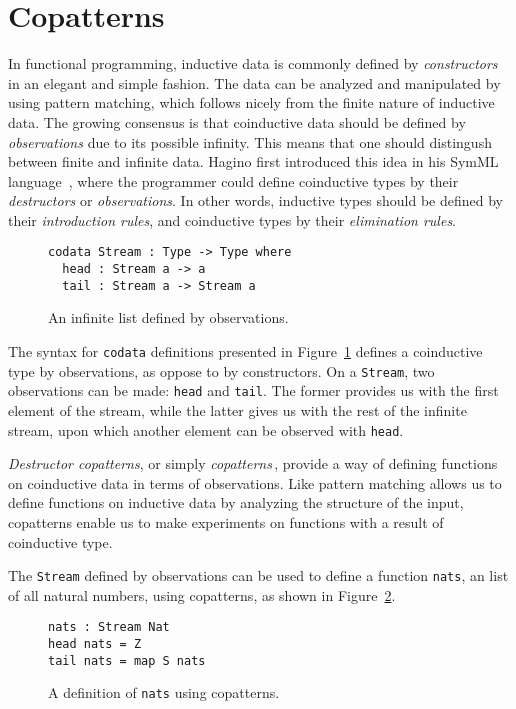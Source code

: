 \section{Copatterns}
\label{sec:copatterns}
In functional programming, inductive data is commonly defined by \emph{constructors} in an
elegant and simple fashion. The data can be analyzed and manipulated by using
pattern matching, which follows nicely from the finite nature of inductive
data. The growing consensus is that coinductive data should be defined by
\emph{observations} due to its possible infinity. This means that one should distingush
between finite and infinite data. Hagino first introduced this idea in his SymML
language \,\citep{Hagino89}, where the programmer could define coinductive types
by their \emph{destructors} or \emph{observations}. In other words, inductive
types should be defined by their \emph{introduction rules}, and coinductive types by
their \emph{elimination rules}.

\begin{figure}[h]
\begin{lstlisting}[mathescape]
codata Stream : Type -> Type where
  head : Stream a -> a
  tail : Stream a -> Stream a 
\end{lstlisting}
\caption{An infinite list defined by observations.}
\label{fig:stream}
\end{figure}

The syntax for \texttt{codata} definitions presented in
Figure~\ref{fig:stream} defines a coinductive type by observations, as oppose to
by constructors. On a \texttt{Stream}, two observations can be made:
\texttt{head} and \texttt{tail}. The former provides us with the first element
of the stream, while the latter gives us with the rest of the infinite stream,
upon which another element can be observed with \texttt{head}. 

\emph{Destructor copatterns}, or simply
\emph{copatterns}\,\citep{Abel13Copatterns}, provide a way of defining functions
on coinductive data in terms of observations. Like pattern matching allows us to
define functions on inductive data by analyzing the structure of the input,
copatterns enable us to make experiments on functions with a result of
coinductive type.

The \texttt{Stream} defined by observations can be used to define a function
\texttt{nats}, an list of all natural numbers, using copatterns, as shown in
Figure~\ref{fig:nats_copatterns}.


\begin{figure}[h]
\begin{lstlisting}[mathescape]
nats : Stream Nat
head nats = Z
tail nats = map S nats
\end{lstlisting}
\caption{A definition of \texttt{nats} using copatterns.}
\label{fig:nats_copatterns}
\end{figure}

